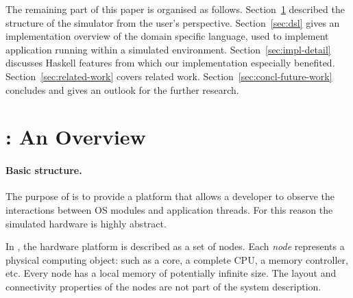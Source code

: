 The remaining part of this paper is organised as follows.
Section~\ref{sec:soosim-an-overview} described the structure of the \soosim simulator from the user's perspective.
Section~\ref{sec:dsl} gives an implementation overview of the domain specific language, used to implement application running within a \soosim simulated environment.
Section~\ref{sec:impl-detail} discusses Haskell features from which our implementation especially benefited.
Section~\ref{sec:related-work} covers related work.
Section~\ref{sec:concl-future-work} concludes and gives an outlook for the further research.

%

\section{\soosim: An Overview}
\label{sec:soosim-an-overview}

\paragraph{Basic structure.}
The purpose of \soosim is to provide a platform that allows a developer to observe the interactions between OS modules and application threads.
For this reason the simulated hardware is highly abstract.

In \soosim, the hardware platform is described as a set of nodes.
Each \emph{node} represents a physical computing object: such as a core, a complete CPU, a memory controller, etc.
Every node has a local memory of potentially infinite size.
The layout and connectivity properties of the nodes are not part of the system description.

